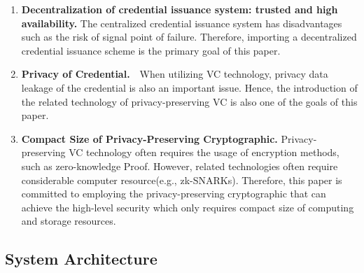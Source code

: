 \documentclass[conference, dvipdfmx]{IEEEtran} %
\begin{document}
\begin{sloppypar}
\begin{table}[htbp]
  \begin{center}
  \caption{Notation}
  \label{table:notation}
  \end{center}
\end{table}


\begin{enumerate}
  \item \textbf{Decentralization of credential issuance system: trusted and high availability.} The centralized credential issuance system has disadvantages such as the risk of signal point of failure. Therefore, importing a decentralized credential issuance scheme is the primary goal of this paper.
  \item \textbf{Privacy of Credential.}　When utilizing VC technology, privacy data leakage of the credential is also an important issue. Hence, the introduction of the related technology of privacy-preserving VC is also one of the goals of this paper.
  \item \textbf{Compact Size of Privacy-Preserving Cryptographic.} Privacy-preserving VC technology often requires the usage of encryption methods, such as zero-knowledge Proof. However, related technologies often require considerable computer resource(e.g., zk-SNARKs). Therefore, this paper is committed to employing the privacy-preserving cryptographic that can achieve the high-level security which only requires compact size of computing and storage resources.
\end{enumerate}

\subsection{System Architecture}


\end{sloppypar}
\end{document}
